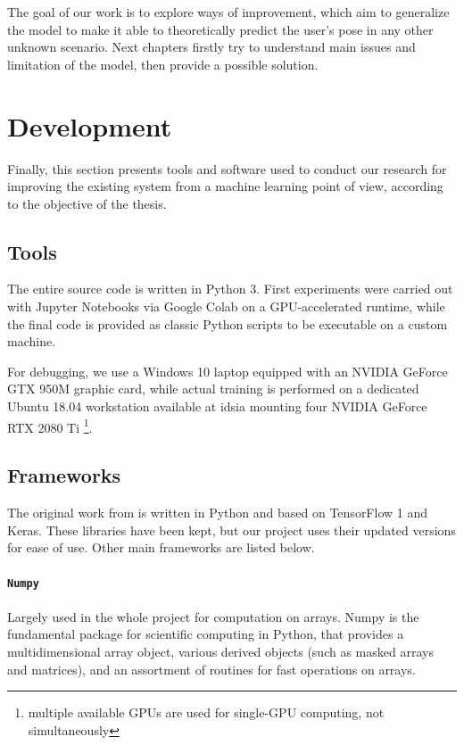 \bigskip

The goal of our work is to explore ways of improvement, which aim to generalize the model to make it able to theoretically predict the user's pose in any other unknown scenario. Next chapters firstly try to understand main issues and limitation of the model, then provide a possible solution.




\section{Development}
\label{sec:software}

Finally, this section presents tools and software used to conduct our research for improving the existing system from a machine learning point of view, according to the objective of the thesis.



\subsection{Tools}
\label{subsec:tools}

The entire source code is written in Python 3. First experiments were carried out with Jupyter Notebooks via Google Colab on a GPU-accelerated runtime, while the final code is provided as classic Python scripts to be executable on a custom machine.

For debugging, we use a Windows 10 laptop equipped with an NVIDIA GeForce GTX 950M graphic card, while actual training is performed on a dedicated Ubuntu 18.04 workstation available at \gls{idsia} mounting four NVIDIA GeForce RTX 2080 Ti \footnote{multiple available GPUs are used for single-GPU computing, not simultaneously}.



\subsection{Frameworks}
\label{subsec:frameworks}

The original work from \cite{mantegazza2019visionbased} is written in Python and based on TensorFlow 1 and Keras. These libraries have been kept, but our project uses their updated versions for ease of use. Other main frameworks are listed below.


\paragraph*{\texttt{Numpy}}
Largely used in the whole project for computation on arrays. Numpy is the fundamental package for scientific computing in Python, that provides a multidimensional array object, various derived objects (such as masked arrays and matrices), and an assortment of routines for fast operations on arrays. 

